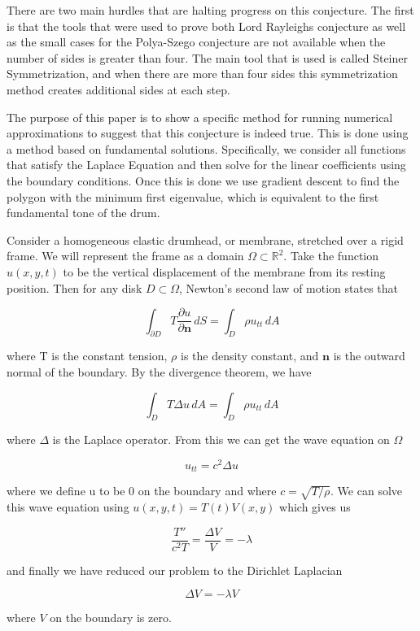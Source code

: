 \documentclass[12pt]{report}
\numberwithin{definition}{section}
\begin{document}
There are two main hurdles that are halting progress on this conjecture.
The first is that the tools that were used to prove both Lord Rayleighs conjecture as well as the small cases for the Polya-Szego conjecture are not available when the number of sides is greater than four.
The main tool that is used is called Steiner Symmetrization, and when there are more than four sides this symmetrization method creates additional sides at each step.

The purpose of this paper is to show a specific method for running numerical approximations to suggest that this conjecture is indeed true.
This is done using a method based on fundamental solutions. 
Specifically, we consider all functions that satisfy the Laplace Equation and then solve for the linear coefficients using the boundary conditions.
Once this is done we use gradient descent to find the polygon with the minimum first eigenvalue, which is equivalent to the first fundamental tone of the drum.



Consider a homogeneous elastic drumhead, or membrane, stretched over a rigid frame.
We will represent the frame as a domain $\Omega \subset \mathbb{R}^{2}$.
Take the function $u(x,y,t)$ to be the vertical displacement of the membrane from its resting position.
Then for any disk $D \subset \Omega$, Newton's second law of motion states that

$$ \int_{\partial D} T \frac{\partial u}{\partial \textbf{n}} \, dS = \int_{ D} \rho u_{tt} \, dA $$

where T is the constant tension, $\rho$ is the density constant, and $\textbf{n}$ is the outward normal of the boundary.
By the divergence theorem, we have

$$ \int_{D} T \Delta u \, dA = \int_{D} \rho u_{tt} \, dA $$

where $\Delta$ is the Laplace operator. From this we can get the wave equation on $\Omega$

$$ u_{tt} = c^{2} \Delta u $$

where we define u to be 0 on the boundary and where $c = \sqrt{T / \rho}$.
We can solve this wave equation using $u(x,y,t) = T(t)V(x,y)$ which gives us

$$ \frac{T''}{c^{2}T} = \frac{\Delta V}{V} = - \lambda $$

and finally we have reduced our problem to the Dirichlet Laplacian

$$ \Delta V = - \lambda V $$

where $V$ on the boundary is zero.
\end{document}
